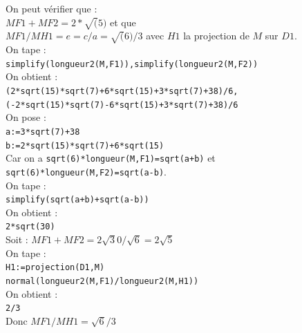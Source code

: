 \documentclass[a4paper,11pt]{book}
\begin{document}
On peut v\'erifier que  :\\
$MF1+MF2=2*\sqrt(5)$ et que \\
$MF1/MH1=e=c/a=\sqrt(6)/3$ avec $H1$ la projection de $M$ sur $D1$.\\
On tape :\\
{\tt simplify(longueur2(M,F1)),simplify(longueur2(M,F2))}\\
On obtient :\\
{\tt (2*sqrt(15)*sqrt(7)+6*sqrt(15)+3*sqrt(7)+38)/6,}\\
{\tt (-2*sqrt(15)*sqrt(7)-6*sqrt(15)+3*sqrt(7)+38)/6}\\
On pose :\\
{\tt a:=3*sqrt(7)+38}\\
{\tt b:=2*sqrt(15)*sqrt(7)+6*sqrt(15)}\\
Car on a {\tt sqrt(6)*longueur(M,F1)=sqrt(a+b)} et\\
 {\tt sqrt(6)*longueur(M,F2)=sqrt(a-b)}.\\
On tape :\\
{\tt simplify(sqrt(a+b)+sqrt(a-b))}\\
On obtient :\\
{\tt 2*sqrt(30)}\\
Soit : $MF1+MF2=2\sqrt 30/\sqrt 6=2\sqrt 5$\\
On tape :\\
{\tt H1:=projection(D1,M)}\\
{\tt normal(longueur2(M,F1)/longueur2(M,H1))}\\
On obtient :\\
{\tt 2/3}\\
Donc  $MF1/MH1=\sqrt6/3$
\end{document}
